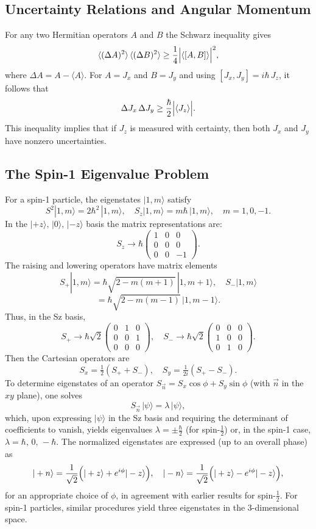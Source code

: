 \documentclass[twocolumn]{article}
\begin{document}
\begin{spacing}{1}
  \subsection{Uncertainty Relations and Angular Momentum}
  For any two Hermitian operators \(A\) and \(B\) the Schwarz inequality gives
  \[
  \langle (\Delta A)^2\rangle\,\langle (\Delta B)^2\rangle \ge \frac{1}{4}\Bigl|\langle[A,B]\rangle\Bigr|^2,
  \]
  where \(\Delta A = A - \langle A\rangle\). For \(A=J_x\) and \(B=J_y\) and using 
  \([J_x,J_y]=i\hbar\,J_z\), it follows that
  \[
  \Delta J_x\,\Delta J_y \ge \frac{\hbar}{2}\Bigl|\langle J_z\rangle\Bigr|.
  \]
  This inequality implies that if \(J_z\) is measured with certainty, then both \(J_x\) and \(J_y\) have nonzero uncertainties.
  
  \subsection{The Spin-1 Eigenvalue Problem}
  For a spin-1 particle, the eigenstates \(|1,m\rangle\) satisfy
  \[
  S^2|1,m\rangle = 2\hbar^2\,|1,m\rangle,\quad S_z|1,m\rangle = m\hbar\,|1,m\rangle,\quad m=1,0,-1.
  \]
  In the \(|+z\rangle,\,|0\rangle,\,|-z\rangle\) basis the matrix representations are:
  \[
  S_z \rightarrow \hbar\begin{pmatrix} 1 & 0 & 0 \\[1mm] 0 & 0 & 0 \\[1mm] 0 & 0 & -1 \end{pmatrix}.
  \]
  The raising and lowering operators have matrix elements
  \[
  S_{+}|1,m\rangle = \hbar\sqrt{2 - m(m+1)}\,|1,m+1\rangle,\quad S_{-}|1,m\rangle 
  \]
  \[
  = \hbar\sqrt{2 - m(m-1)}\,|1,m-1\rangle.
  \]
  Thus, in the Sz basis,
  \[
  S_{+}\rightarrow \hbar\sqrt{2}\begin{pmatrix}0 & 1 & 0 \\[1mm] 0 & 0 & 1 \\[1mm] 0 & 0 & 0\end{pmatrix},\quad S_{-}\rightarrow \hbar\sqrt{2}\begin{pmatrix}0 & 0 & 0 \\[1mm] 1 & 0 & 0 \\[1mm] 0 & 1 & 0\end{pmatrix}.
  \]
  Then the Cartesian operators are
  \[
  S_x=\tfrac{1}{2}(S_{+}+S_{-}),\quad S_y=\tfrac{1}{2i}(S_{+}-S_{-}).
  \]
  To determine eigenstates of an operator \(S_{\vec{n}}=S_x\cos\phi+S_y\sin\phi\) (with \(\vec{n}\) in the \(xy\) plane), one solves
  \[
  S_{\vec{n}}\,|\psi\rangle = \lambda\,|\psi\rangle,
  \]
  which, upon expressing \(|\psi\rangle\) in the Sz basis and requiring the determinant of coefficients to vanish, yields eigenvalues \(\lambda=\pm\frac{\hbar}{2}\) (for spin-\(\frac{1}{2}\)) or, in the spin-1 case, \(\lambda=\hbar,\,0,\,-\hbar\). The normalized eigenstates are expressed (up to an overall phase) as
  \[
  |+n\rangle = \frac{1}{\sqrt{2}}\Bigl(|+z\rangle + e^{i\phi}|-z\rangle\Bigr),\quad
  |-n\rangle = \frac{1}{\sqrt{2}}\Bigl(|+z\rangle - e^{i\phi}|-z\rangle\Bigr),
  \]
  for an appropriate choice of \(\phi\), in agreement with earlier results for spin-\(\frac{1}{2}\). For spin-1 particles, similar procedures yield three eigenstates in the 3-dimensional space.
  

\end{spacing}
\end{document}
